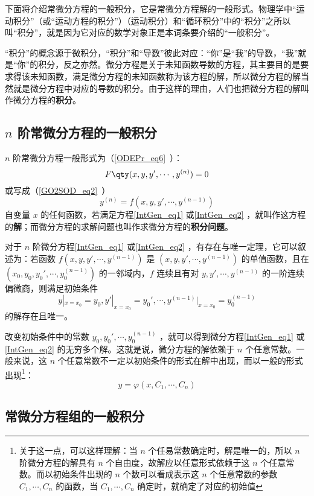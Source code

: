 下面将介绍常微分方程的一般积分，它是常微分方程解的一般形式。物理学中“运动积分”（或“运动方程的积分”）（运动积分）和“循环积分”中的“积分”之所以叫“积分”，就是因为它对应的数学对象正是本词条要介绍的“一般积分”。

“积分”的概念源于微积分，“积分”和“导数”彼此对应：“你”是“我”的导数，“我”就是“你”的积分，反之亦然。微分方程是关于未知函数导数的方程，其主要目的是要求得该未知函数，满足微分方程的未知函数称为该方程的解，所以微分方程的解当然就是微分方程中对应的导数的积分。由于这样的理由，人们也把微分方程的解叫作微分方程的\textbf{积分}。
\subsection{$n$ 阶常微分方程的一般积分}
$n$ 阶常微分方程一般形式为（\autoref{ODEPr_eq6}~）：
\begin{equation}\label{IntGen_eq1}
F \qty(x,y,y',\cdots,y^{(n)}) =0
\end{equation}
或写成（\autoref{GO2SOD_eq2}~）
\begin{equation}\label{IntGen_eq2}
y^{(n)}=f(x,y,y',\cdots,y^{(n-1)})
\end{equation}
自变量 $x$ 的任何函数，若满足方程\autoref{IntGen_eq1} 或\autoref{IntGen_eq2} ，就叫作这方程的\textbf{解}；而微分方程的求解问题也叫作求微分方程的\textbf{积分问题}。

对于 $n$ 阶微分方程\autoref{IntGen_eq1} 或\autoref{IntGen_eq2} ，有存在与唯一定理，它可以叙述为：若函数 $f(x,y,y',\cdots,y^{(n-1)})$ 是 $(x,y,y',\cdots,y^{(n-1)})$ 的单值函数，且在 $(x_0,y_0,y_0',\cdots,y_0^{(n-1)})$ 的一邻域内，$f$ 连续且有对 $y,y',\cdots,y^{(n-1)}$ 的一阶连续偏微商，则满足初始条件
\begin{equation}
y|_{x=x_0}=y_0,y'|_{x=x_0}=y_0',\cdots,y^{(n-1)}|_{x=x_0}=y_0^{(n-1)}
\end{equation}
的解存在且唯一。

改变初始条件中的常数 $y_0,y_0',\cdots,y_0^{(n-1)}$ ，就可以得到微分方程\autoref{IntGen_eq1} 或\autoref{IntGen_eq2} 的无穷多个解。这就是说，微分方程的解依赖于 $n$ 个任意常数。一般来说，这 $n$ 个任意常数不一定以初始条件的形式在解中出现，而以一般的形式出现\footnote{关于这一点，可以这样理解：当 $n$ 个任易常数确定时，解是唯一的，所以 $n$ 阶微分方程的解具有 $n$ 个自由度，故解应以任意形式依赖于这 $n$ 个任意常数。而以初始条件出现的 $n$ 个数可以看成表示这 $n$ 个任意常数的参数 $C_1,\cdots,C_n$ 的函数，当 $C_1,\cdots,C_n$ 确定时，就确定了对应的初始值}：
\begin{equation}
y=\varphi(x,C_1,\cdots,C_n)
\end{equation}

\subsection{常微分方程组的一般积分}

